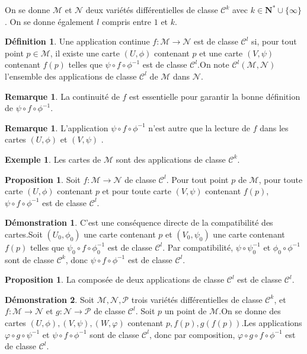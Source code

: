 \documentclass[12pt,a4paper]{article}
\theoremstyle{definition}
\newtheorem{prop}[thm]{Proposition}
\newtheorem{defn}[thm]{Définition}
\newtheorem{ex}[thm]{Exemple}
\newtheorem{rqe}[thm]{Remarque}
\newtheorem*{dem}{Démonstration}
\begin{document}
On se donne $\mathcal{M}$ et $\mathcal{N}$ deux variétés différentielles de classe $\mathcal{C}^k$ avec $k\in\mathbf{N}^*\cup\{\infty\}$. On se donne également $l$ compris entre $1$ et $k$.
\begin{defn}
Une application continue $f:\mathcal{M}\to\mathcal{N}$ est de classe $\mathcal{C}^l$ si, pour tout point $p\in\mathcal{M}$, il existe une carte $(U,\phi)$ contenant $p$ et une carte $(V,\psi)$ contenant $f(p)$ telles que $\psi\circ f\circ\phi^{-1}$ est de classe $\mathcal{C}^l$.\newline On note $\mathcal{C}^l(\mathcal{M},\mathcal{N})$ l'ensemble des applications de classe $\mathcal{C}^l$ de $\mathcal{M}$ dans $\mathcal{N}$.
\end{defn}
\begin{rqe}
La continuité de $f$ est essentielle pour garantir la bonne définition de $\psi\circ f\circ\phi^{-1}$.
\end{rqe}
\begin{rqe}
L'application $\psi\circ f\circ\phi^{-1}$ n'est autre que la \og lecture de $f$ dans les cartes $(U,\phi)$ et $(V,\psi)$ \fg{}. 
\end{rqe}
\begin{ex}
Les cartes de $\mathcal{M}$ sont des applications de classe $\mathcal{C}^k$.
\end{ex}
\begin{prop}
Soit $f:\mathcal{M}\to\mathcal{N}$ de classe $\mathcal{C}^l$. Pour tout point $p$ de $\mathcal{M}$, pour toute carte $(U,\phi)$ contenant $p$ et pour toute carte $(V,\psi)$ contenant $f(p)$, $\psi\circ f\circ\phi^{-1}$ est de classe $\mathcal{C}^l$.
\end{prop}
\begin{dem}
C'est une conséquence directe de la compatibilité des cartes.\newline Soit $(U_0,\phi_0)$ une carte contenant $p$ et $(V_0,\psi_0)$ une carte contenant $f(p)$ telles que $\psi_0\circ f\circ\phi_0^{-1}$ est de classe $\mathcal{C}^l$. Par compatibilité, $\psi\circ\psi_0^{-1}$ et $\phi_0\circ\phi^{-1}$ sont de classe $\mathcal{C}^k$, donc $\psi\circ f\circ\phi^{-1}$ est de classe $\mathcal{C}^l$.
\end{dem}
\begin{prop}
La composée de deux applications de classe $\mathcal{C}^l$ est de classe $\mathcal{C}^l$.
\end{prop}
\begin{dem}
Soit $\mathcal{M},\mathcal{N},\mathcal{P}$ trois variétés différentielles de classe $\mathcal{C}^k$, et\newline $f:\mathcal{M}\to\mathcal{N}$ et $g:\mathcal{N}\to\mathcal{P}$ de classe $\mathcal{C}^l$. Soit $p$ un point de $\mathcal{M}$.\newline On se donne des cartes $(U,\phi),(V,\psi),(W,\varphi)$ contenant $p,f(p),g(f(p))$.\newline Les applications $\varphi\circ g\circ\psi^{-1}$ et $\psi\circ f\circ\phi^{-1}$ sont de classe $\mathcal{C}^l$, donc par composition, $\varphi\circ g\circ f\circ\phi^{-1}$ est de classe $\mathcal{C}^l$.
\end{dem}
\end{document}
